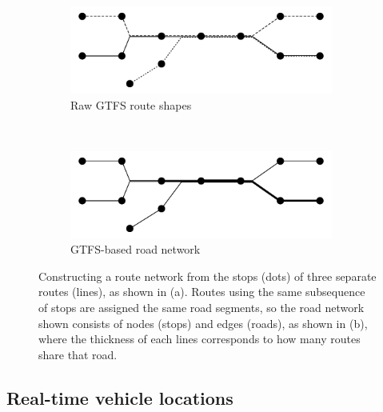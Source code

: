 \begin{figure}[tb]
    \centering
    \begin{subfigure}{0.7\textwidth}
        \centering
        \includegraphics[width=0.95\textwidth]{figures/02_network_segments_1.pdf}
        \caption{Raw GTFS route shapes}
        \label{fig:network_creation_1}
    \end{subfigure} \\
    \begin{subfigure}{0.7\textwidth}
        \centering
        \includegraphics[width=0.95\textwidth]{figures/02_network_segments_2.pdf}
        \caption{GTFS-based road network}
        \label{fig:network_creation_2}
    \end{subfigure}
    \caption{
        Constructing a route network from the stops (dots) of three separate
        routes (lines), as shown in (a).
        Routes using the same subsequence of stops are assigned the same
        road segments, so the road network shown 
        consists of nodes (stops) and edges (roads),
        as shown in (b), where the thickness of each lines
        corresponds to how many routes share that road.
    }
    \label{fig:network_creation}
\end{figure}


\subsection{Real-time vehicle locations}
\label{sec:realtime_data}

